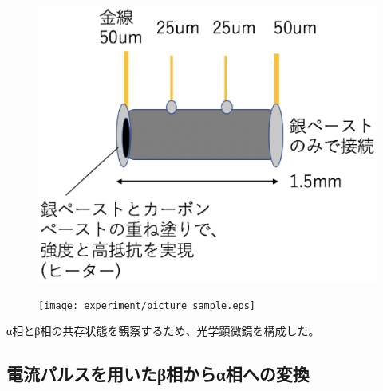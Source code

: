 \begin{figure}[htb]
 \begin{minipage}{0.4\hsize}
    \begin{center}
   \includegraphics[width=\hsize]{experiment/schematics_sample.eps}
  \end{center}
  \caption{}
  \label{fig:schematics_sample}
 \end{minipage}
 \begin{minipage}{0.6\hsize}
     \begin{center}
   \texttt{[image: experiment/picture\_sample.eps]}
  \end{center}
  \caption{}
  \label{fig:picture_sample}
   \end{minipage}
\end{figure}


α相とβ相の共存状態を観察するため、光学顕微鏡を構成した。

\subsection{電流パルスを用いたβ相からα相への変換}

\newpage

